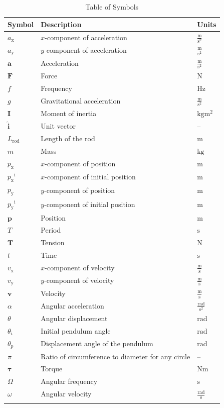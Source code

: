 \documentclass[12pt]{article}
\begin{document}
\begin{longtable}{l l l}
\toprule
\textbf{Symbol} & \textbf{Description} & \textbf{Units}
\\
\midrule
\endhead
${a_{\text{x}}}$ & $x$-component of acceleration & $\frac{\text{m}}{\text{s}^{2}}$
\\
${a_{\text{y}}}$ & $y$-component of acceleration & $\frac{\text{m}}{\text{s}^{2}}$
\\
$\symbf{a}$ & Acceleration & $\frac{\text{m}}{\text{s}^{2}}$
\\
$\symbf{F}$ & Force & ${\text{N}}$
\\
$f$ & Frequency & ${\text{Hz}}$
\\
$g$ & Gravitational acceleration & $\frac{\text{m}}{\text{s}^{2}}$
\\
$\symbf{I}$ & Moment of inertia & $\text{kg}\text{m}^{2}$
\\
$\symbf{\hat{i}}$ & Unit vector & --
\\
${L_{\text{rod}}}$ & Length of the rod & ${\text{m}}$
\\
$m$ & Mass & ${\text{kg}}$
\\
${p_{\text{x}}}$ & $x$-component of position & ${\text{m}}$
\\
${{p_{\text{x}}}^{\text{i}}}$ & $x$-component of initial position & ${\text{m}}$
\\
${p_{\text{y}}}$ & $y$-component of position & ${\text{m}}$
\\
${{p_{\text{y}}}^{\text{i}}}$ & $y$-component of initial position & ${\text{m}}$
\\
$\symbf{p}$ & Position & ${\text{m}}$
\\
$T$ & Period & ${\text{s}}$
\\
$\symbf{T}$ & Tension & ${\text{N}}$
\\
$t$ & Time & ${\text{s}}$
\\
${v_{\text{x}}}$ & $x$-component of velocity & $\frac{\text{m}}{\text{s}}$
\\
${v_{\text{y}}}$ & $y$-component of velocity & $\frac{\text{m}}{\text{s}}$
\\
$\symbf{v}$ & Velocity & $\frac{\text{m}}{\text{s}}$
\\
$α$ & Angular acceleration & $\frac{\text{rad}}{\text{s}^{2}}$
\\
$θ$ & Angular displacement & ${\text{rad}}$
\\
${θ_{i}}$ & Initial pendulum angle & ${\text{rad}}$
\\
${θ_{p}}$ & Displacement angle of the pendulum & ${\text{rad}}$
\\
$π$ & Ratio of circumference to diameter for any circle & --
\\
$\symbf{τ}$ & Torque & $\text{N}\text{m}$
\\
$Ω$ & Angular frequency & ${\text{s}}$
\\
$ω$ & Angular velocity & $\frac{\text{rad}}{\text{s}}$
\\
\bottomrule
\caption{Table of Symbols}
\label{Table:ToS}
\end{longtable}
\end{document}
